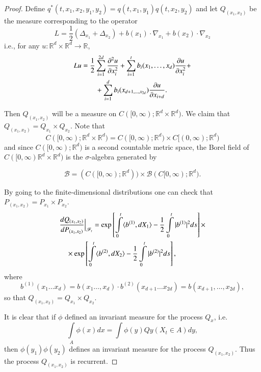 \begin{proof}
Define
$q^{*}(t,x_{1},x_{2},y_{1},y_{2})=q(t,x_{1},y_{1})q(t,x_{2},y_{2})$
and let $Q_{(x_{1},x_{2})}$ be the measure corresponding to the
operator
$$
L=\frac{1}{2}(\Delta_{x_{1}}+\Delta_{x_{2}})+b(x_{1})\cdot
\nabla_{x_{1}}+b(x_{2})\cdot \nabla_{x_{2}}
$$
i.e., for any $u:\mathbb{R}^{d}\times \mathbb{R}^{d}\to \mathbb{R}$, 
\begin{align*}
Lu &= \frac{1}{2}\sum\limits^{2d}_{i=1}\frac{\partial^{2}u}{\partial
  x^{2}_{i}}+\sum\limits^{t}_{i=1}b_{i}(x_{1},\ldots,x_{d})\frac{\partial
  u}{\partial x^{2}_{i}}+\\
&\qquad +\sum\limits^{d}_{i=1}b_{i}(x_{d+1,\ldots,x_{2d}})\frac{\partial u}{\partial x_{i+d}}.
\end{align*}

Then $Q_{(x_{1},x_{2})}$ will be a measure on
$C([0,\infty);\mathbb{R}^{d}\times \mathbb{R}^{d})$. We claim that
  $Q_{(x_{1},x_{2})}=Q_{x_{1}}\times Q_{x_{2}}$. Note that
$$
C([0,\infty);\mathbb{R}^{d}\times
  \mathbb{R}^{d})=C([0,\infty);\mathbb{R}^{d})\times
    C[(0,\infty);\mathbb{R}^{d}) 
$$\pageoriginale
and since $C([0,\infty);\mathbb{R}^{d})$ is a second countable metric
  space, the Borel field of $C([0,\infty)\mathbb{R}^{d}\times
    \mathbb{R}^{d})$ is the $\sigma$-algebra generated by
    
$$
\mathscr{B}=(C([0,\infty);\mathbb{R}^{d}))\times\mathscr{B}(C[0,\infty);\mathbb{R}^{d}).
$$ 

By going to the finite-dimensional distributions one can check that
$P_{(x_{1},x_{2})}=P_{x_{1}}\times P_{x_{2}}$.
\begin{align*}
& \frac{dQ_{(x_{1},x_{2})}}{dP_{(x_{1},x_{2})}}\Big|_{\mathscr{F}_{t}}=\exp
  \left[\int\limits^{t}_{0}\langle b^{(1)},dX_{1}\rangle
    -\frac{1}{2}\int\limits^{t}_{0}|b^{(1)}|^{2}ds\right]\times\\
&\quad \times \exp \left[\int\limits^{t}_{0}\langle b^{(2)},dX_{2}\rangle
    -\frac{1}{2}\int\limits^{t}_{0}|b^{(2)}|^{2}ds\right], 
\end{align*}
where 
$$
b^{(1)}(x_{1}\ldots
x_{d})=b(x_{1}\ldots,x_{d})\cdot  
b^{(2)}(x_{d+1}\ldots
x_{2d})=b(x_{d+1},\ldots,x_{2d}),
$$ 
so that
$Q_{(x_{1},x_{2})}=Q_{x_{1}}\times Q_{x_{2}}$.

It is clear that if $\phi$ defined an invariant measure for the
process $Q_{x}$, i.e.
$$
\int\limits_{A}\phi(x)dx=\int \phi(y)Qy(X_{t}\in A)dy,
$$
then $\phi(y_{1})\phi(y_{2})$ defines an invariant measure for the
process $Q_{(x_{1},x_{2})}$. Thus the process $Q_{(x_{1},x_{2})}$ is
recurrent.


\end{proof}
